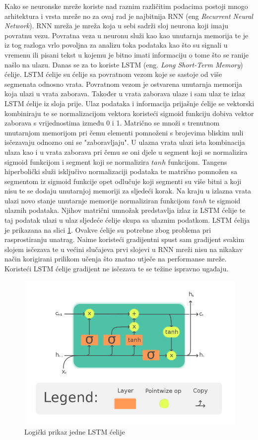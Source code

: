 \documentclass[times, utf8, diplomski]{fer}
\begin{document}
Kako se neuronske mreže koriste nad raznim različitim podacima postoji mnogo arhitektura i vrsta mreže no za
ovaj rad je najbitnija RNN (eng \textit{Recurrent Neural Network}). RNN mreža je mreža koja u sebi sadrži
sloj neurona koji imaju povratnu vezu. Povratna veza u neuronu služi kao kao unutarnja memorija te je iz tog razloga
vrlo povoljna za analizu toka podataka kao što su signali u vremenu ili pisani tekst u kojemu je bitno imati informaciju
o tome što se ranije našlo na ulazu. Danas se za to koriste LSTM (eng. \textit{Long Short-Term Memory}) ćelije.
LSTM ćelije su ćelije sa povratnom vezom koje se sastoje od više segmenata odnosno vrata. Povratnom vezom
je ostvarena unutarnja memorija koja ulazi u vrata zaborava. Također u vrata zaborava ulaze i sam ulaz te
izlaz LSTM ćelije iz sloja prije. Ulaz podataka i informacija prijašnje ćelije se vektorski kombiniraju te
se normalizacijom vektora koristeći sigmoid funkciju dobiva vektor zaborava s vrijednostima između 0 i 1.
Matrično se množi s trenutnom unutarnjom memorijom pri čemu elementi pomnoženi s brojevima bliskim nuli
isčezavaju odnozno oni se "zaboravljaju". U ulazna vrata ulazi ista kombinacija ulaza kao i u vrata zaborava
pri čemu se oni djele u segment koji se normalizira sigmoid funkcijom i segment koji se normalizira $tanh$
funkcijom. Tangens hiperbolički služi isključivo normalizaciji podataka te matrično pomnožen sa segmentom
iz sigmoid funkcije opet odlučuje koji segmenti su više bitni a koji nisu te se dodaju unutarnjoj memoriji
za sljedeći korak. Na kraju u izlazna vrata ulazi novo stanje unutarnje memorije normaliziran funkcijom
$tanh$ te sigmoid ulaznih podataka. Njihov matrični umnožak predstavlja izlaz iz LSTM ćelije te taj podatak
ulazi u ulaz sljedeće ćelije skupa sa ulaznim podatkom. LSTM ćelija je prikazana na slici \ref{lstm}.
Ovakve ćelije su potrebne zbog problema pri rasprostiranju unatrag. Naime koristeći gradijentni spust sam
gradijent svakim slojem isčezava te u većini slučajeva prvi slojevi u RNN mreži nisu na nikakav način korigirani
prilikom učenja što znatno utječe na performanse mreže. Koristeći LSTM ćelije gradijent ne isčezava te
se težine ispravno ugađaju.

\begin{figure}[h!]
    \includegraphics[width=\textwidth]{The_LSTM_Cell.svg.png}
    \caption{Logički prikaz jedne LSTM ćelije}
    \label{lstm}
\end{figure}
\end{document}
